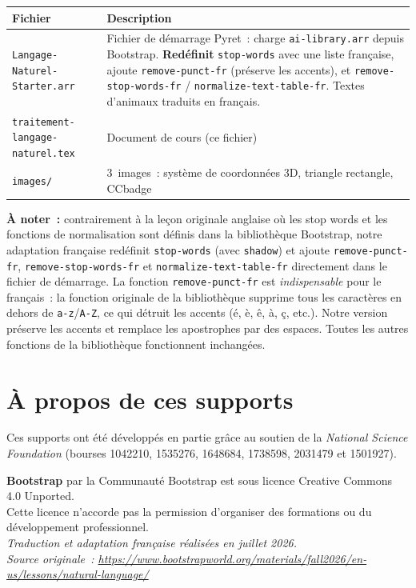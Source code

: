 \documentclass[12pt,a4paper]{article}
\begin{document}
\begin{center}
\begin{tabularx}{\textwidth}{l X}
  \toprule
  \textbf{Fichier} & \textbf{Description} \\
  \midrule
  \texttt{Langage\allowbreak-Naturel\allowbreak-Starter.arr} & Fichier de démarrage Pyret~: charge \texttt{ai-library.arr} depuis Bootstrap. \textbf{Redéfinit} \texttt{stop-words} avec une liste française, ajoute \texttt{remove\allowbreak-punct\allowbreak-fr} (préserve les accents), et \texttt{remove-stop-words-fr} / \texttt{normalize\allowbreak-text\allowbreak-table-fr}. Textes d'animaux traduits en français. \\
  \texttt{traitement-langage-naturel.tex} & Document de cours (ce fichier) \\
  \texttt{images/} & 3~images~: système de coordonnées 3D, triangle rectangle, CCbadge \\
  \bottomrule
\end{tabularx}
\end{center}

\vspace{1em}
\textbf{À noter~:} contrairement à la leçon originale anglaise où les stop words et les fonctions de normalisation sont définis dans la bibliothèque Bootstrap, notre adaptation française redéfinit \texttt{stop-words} (avec \texttt{shadow}) et ajoute \texttt{remove\allowbreak-punct\allowbreak-fr}, \texttt{remove\allowbreak-stop\allowbreak-words-fr} et \texttt{normalize\allowbreak-text\allowbreak-table-fr} directement dans le fichier de démarrage. La fonction \texttt{remove\allowbreak-punct\allowbreak-fr} est \emph{indispensable} pour le français~: la fonction originale de la bibliothèque supprime tous les caractères en dehors de \texttt{a-z}/\texttt{A-Z}, ce qui détruit les accents (é, è, ê, à, ç, etc.). Notre version préserve les accents et remplace les apostrophes par des espaces. Toutes les autres fonctions de la bibliothèque fonctionnent inchangées.

\section*{À propos de ces supports}

Ces supports ont été développés en partie grâce au soutien de la \emph{National Science Foundation} (bourses 1042210, 1535276, 1648684, 1738598, 2031479 et 1501927).

\begin{center}
  \textbf{Bootstrap} par la Communauté Bootstrap est sous licence Creative Commons 4.0 Unported.\\
  Cette licence n'accorde pas la permission d'organiser des formations ou du développement professionnel.\\[1em]
  \textit{Traduction et adaptation française réalisées en juillet 2026.}\\
  \textit{Source originale~: \url{https://www.bootstrapworld.org/materials/fall2026/en-us/lessons/natural-language/}}
\end{center}
\end{document}
